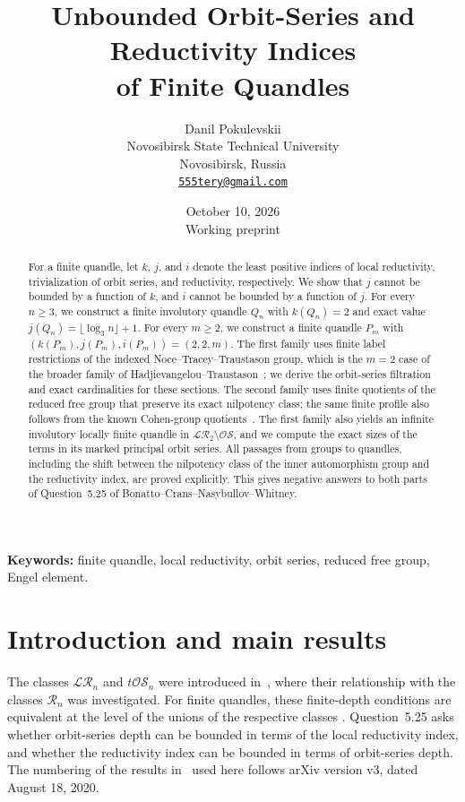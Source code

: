 \documentclass[11pt,a4paper]{article}
\title{Unbounded Orbit-Series and Reductivity Indices\\
of Finite Quandles}
\author{Danil Pokulevskii\\[3pt]
  \small Novosibirsk State Technical University\\
  \small Novosibirsk, Russia\\
  \small\href{mailto:555tery@gmail.com}{\texttt{555tery@gmail.com}}}
\date{October 10, 2026\\[2pt]\small Working preprint}
\theoremstyle{definition}
\theoremstyle{remark}
\newcommand{\R}{\mathcal R}
\newcommand{\LR}{\mathcal{LR}}
\newcommand{\OS}{\mathcal{OS}}
\newcommand{\tOS}{t\mathcal{OS}}
\begin{document}
\maketitle
\begin{abstract}
For a finite quandle, let \(k\), \(j\), and \(i\) denote the
least positive indices of local reductivity, trivialization of
orbit series, and reductivity, respectively.
We show that \(j\) cannot be bounded by a function of \(k\),
and \(i\) cannot be bounded by a function of \(j\).
For every \(n\ge3\), we construct a finite involutory quandle \(Q_n\) with
\(k(Q_n)=2\) and exact value \(j(Q_n)=\lfloor\log_3n\rfloor+1\).
For every \(m\ge2\), we construct a finite quandle \(P_m\) with
\((k(P_m),j(P_m),i(P_m))=(2,2,m)\).
The first family uses finite label restrictions of the indexed
Noce--Tracey--Traustason group, which is the \(m=2\) case of the broader
family of Hadjievangelou--Traustason~\cite{HT}; we derive the orbit-series
filtration and exact cardinalities for these sections. The second family
uses finite quotients of the reduced free group that preserve its exact
nilpotency class; the same finite profile also follows from the known
Cohen-group quotients~\cite{CMW}. The first family also yields an infinite involutory
locally finite quandle in \(\LR_2\setminus\OS\), and we compute the
exact sizes of the terms in its marked principal orbit series.
All passages from groups to quandles,
including the shift between the nilpotency class of the inner
automorphism group and the reductivity index, are proved explicitly.
This gives negative answers to both parts of Question~5.25
of Bonatto--Crans--Nasybullov--Whitney.
\end{abstract}

\noindent\textbf{Keywords:} finite quandle, local reductivity,
orbit series, reduced free group, Engel element.

\section{Introduction and main results}

The classes \(\LR_n\) and \(\tOS_n\) were introduced in~\cite{BCNW},
where their relationship with the classes \(\R_n\) was investigated.
For finite quandles, these finite-depth conditions are equivalent
at the level of the unions of the respective classes
\cite[Corollary~5.19]{BCNW}.
Question~5.25 asks whether orbit-series depth can be bounded
in terms of the local reductivity index, and whether the reductivity
index can be bounded in terms of orbit-series depth.
The numbering of the results in~\cite{BCNW} used here follows
arXiv version v3, dated August 18, 2020.
\end{document}
